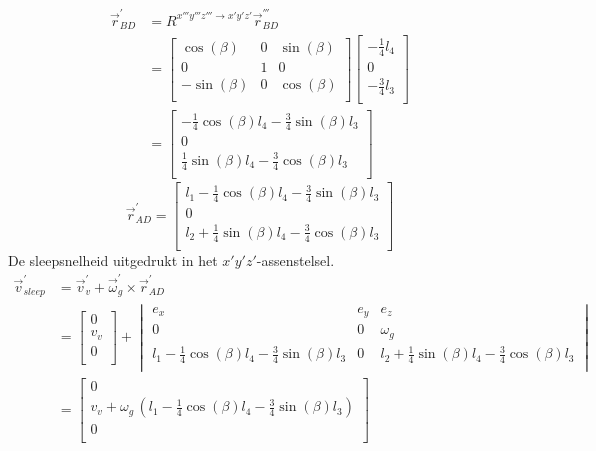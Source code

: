 \begin{equation}
\begin{split}
\vec{r}_{BD}^{'}&=R^{x'''y'''z''' \rightarrow x'y'z'}\vec{r}_{BD}^{'''}\\
&=\begin{bmatrix}
\cos(\beta)	&			0			&\sin(\beta)\\
0						&			1			&			0		 \\
-\sin(\beta)&			0			&\cos(\beta)\\
\end{bmatrix}
\begin{bmatrix}
-\frac{1}{4}l_{4}\\
0\\
-\frac{3}{4}l_{3}\\
\end{bmatrix}\\
&=\begin{bmatrix}
-\frac{1}{4}\cos(\beta)l_{4}-\frac{3}{4}\sin(\beta)l_{3}\\
0\\
\frac{1}{4}\sin(\beta)l_{4}-\frac{3}{4}\cos(\beta)l_{3}\\
\end{bmatrix}
\end{split}
\label{eq:kin4.5}
\end{equation}
\begin{equation}
\vec{r}_{AD}^{'}=
\begin{bmatrix}
l_{1}-\frac{1}{4}\cos(\beta)l_{4}-\frac{3}{4}\sin(\beta)l_{3}\\
0\\
l_{2}+\frac{1}{4}\sin(\beta)l_{4}-\frac{3}{4}\cos(\beta)l_{3}\\
\end{bmatrix}
\label{eq:kin4.6}
\end{equation}
De sleepsnelheid uitgedrukt in het $x'y'z'$-assenstelsel.
\begin{equation}
\begin{split}
\vec{v}_{sleep}^{'}&=\vec{v}_{v}^{'}+\vec{\omega}_{g}^{'}\times\vec{r}_{AD}^{'}\\
&=\begin{bmatrix}
0						\\
v_{v}	\\
0						\\
\end{bmatrix}
+\begin{vmatrix}
e_{x}&e_{y}&e_{z}\\
0&0&\omega_{g}\\
l_{1}-\frac{1}{4}\cos(\beta)l_{4}-\frac{3}{4}\sin(\beta)l_{3}&0&l_{2}+\frac{1}{4}\sin(\beta)l_{4}-\frac{3}{4}\cos(\beta)l_{3}\\
\end{vmatrix}\\
&=\begin{bmatrix}
0						\\
v_{v}+\omega_{g}\,\left(l_{1}-\frac{1}{4}\cos(\beta)l_{4}-\frac{3}{4}\sin(\beta)l_{3}\right)\\
0						\\
\end{bmatrix}
\end{split}
\label{eq:kin4.7}
\end{equation}
